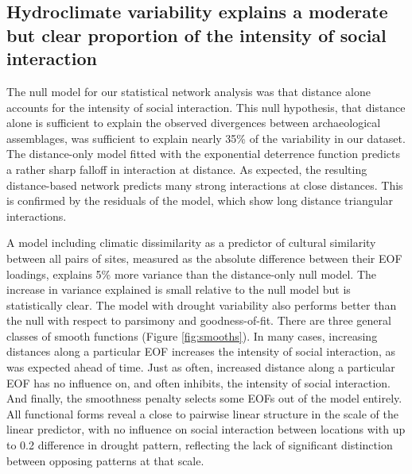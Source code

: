 \documentclass[10pt]{iopart}
\begin{document}



\subsection*{Hydroclimate variability explains a moderate but clear proportion of the intensity of social interaction}
The null model for our statistical network analysis was that distance alone accounts for the intensity of social interaction. This null hypothesis, that distance alone is sufficient to explain the observed divergences between archaeological assemblages, was sufficient to explain nearly 35\% of the variability in our dataset. The distance-only model fitted with the exponential deterrence function predicts a rather sharp falloff in interaction at distance. As expected, the resulting distance-based network predicts many strong interactions at close distances. This is confirmed by the residuals of the model, which show long distance triangular interactions.

A model including climatic dissimilarity as a predictor of cultural similarity between all pairs of sites, measured as the absolute difference between their EOF loadings, explains 5\% more variance than the distance-only null model. The increase in variance explained is small relative to the null model but is statistically clear. The model with drought variability also performs better than the null with respect to parsimony and goodness-of-fit. There are three general classes of smooth functions (Figure \ref{fig:smooths}). In many cases, increasing distances along a particular EOF increases the intensity of social interaction, as was expected ahead of time. Just as often, increased distance along a particular EOF has no influence on, and often inhibits, the intensity of social interaction. And finally, the smoothness penalty selects some EOFs out of the model entirely. All functional forms reveal a close to pairwise linear structure in the scale of the linear predictor, with no influence on social interaction between locations with up to 0.2 difference in drought pattern, reflecting the lack of significant distinction between opposing patterns at that scale. 
\end{document}

